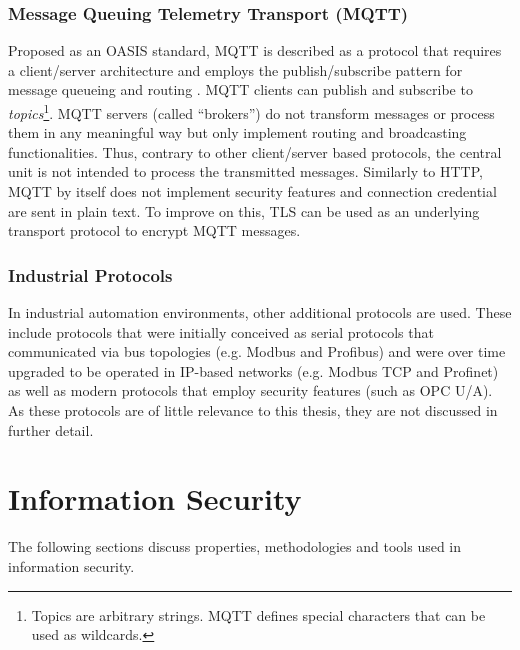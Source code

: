 \subsubsection{Message Queuing Telemetry Transport (\ac{MQTT})}
Proposed as an \ac{OASIS} standard, \ac{MQTT} is described as a protocol that requires a client/server architecture and employs the publish/subscribe pattern for message queueing and routing \cite{gupta_banks_2019}. \ac{MQTT} clients can publish and subscribe to \emph{topics}\footnote{Topics are arbitrary strings. \ac{MQTT} defines special characters that can be used as wildcards.}. \ac{MQTT} servers (called \enquote{brokers}) do not transform messages or process them in any meaningful way but only implement routing and broadcasting functionalities. Thus, contrary to other client/server based protocols, the central unit is not intended to process the transmitted messages. Similarly to \ac{HTTP}, \ac{MQTT} by itself does not implement security features and connection credential are sent in plain text. To improve on this, \ac{TLS} can be used as an underlying transport protocol to encrypt \ac{MQTT} messages.

\subsubsection{Industrial Protocols}
In industrial automation environments, other additional protocols are used. These include protocols that were initially conceived as serial protocols that communicated via bus topologies (e.g. Modbus and Profibus) and were over time upgraded to be operated in \ac{IP}-based networks (e.g. Modbus \ac{TCP} and Profinet) as well as modern protocols that employ security features (such as \ac{OPC U/A}). As these protocols are of little relevance to this thesis, they are not discussed in further detail.

\section{Information Security}
\label{sec:information-security}
The following sections discuss properties, methodologies and tools used in information security.

